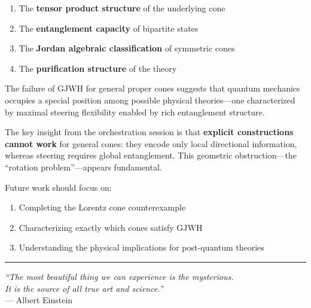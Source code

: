 \documentclass[11pt,a4paper]{article}
\theoremstyle{definition}
\begin{document}
\begin{enumerate}
    \item The \textbf{tensor product structure} of the underlying cone
    \item The \textbf{entanglement capacity} of bipartite states
    \item The \textbf{Jordan algebraic classification} of symmetric cones
    \item The \textbf{purification structure} of the theory
\end{enumerate}

The failure of GJWH for general proper cones suggests that quantum mechanics occupies a special position among possible physical theories---one characterized by maximal steering flexibility enabled by rich entanglement structure.

The key insight from the orchestration session is that \textbf{explicit constructions cannot work} for general cones: they encode only local directional information, whereas steering requires global entanglement. This geometric obstruction---the ``rotation problem''---appears fundamental.

Future work should focus on:
\begin{enumerate}
    \item Completing the Lorentz cone counterexample
    \item Characterizing exactly which cones satisfy GJWH
    \item Understanding the physical implications for post-quantum theories
\end{enumerate}

\vspace{1em}
\begin{center}
\rule{0.5\textwidth}{0.4pt}

\textit{``The most beautiful thing we can experience is the mysterious.\\
It is the source of all true art and science.''}\\
--- Albert Einstein
\end{center}

\end{document}
